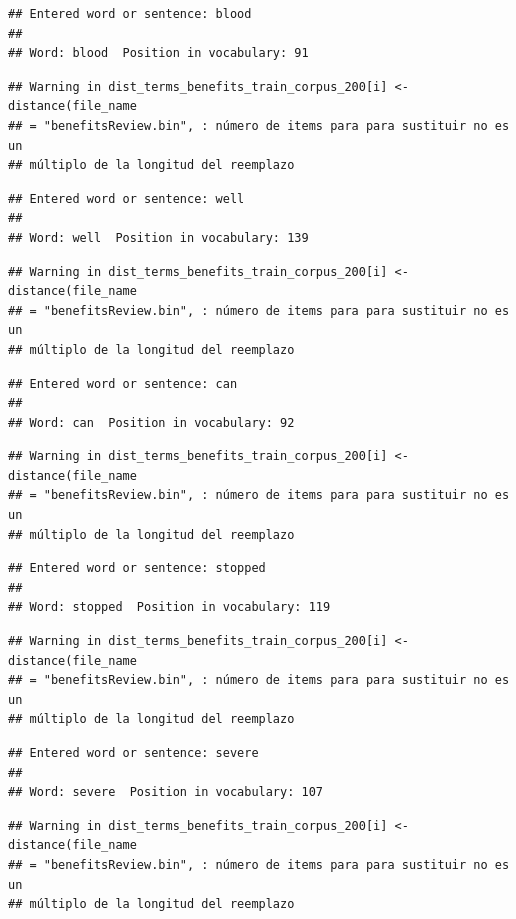 \documentclass[spanish,]{article}
\begin{document}
\begin{verbatim}
## Entered word or sentence: blood
## 
## Word: blood  Position in vocabulary: 91
\end{verbatim}

\begin{verbatim}
## Warning in dist_terms_benefits_train_corpus_200[i] <- distance(file_name
## = "benefitsReview.bin", : número de items para para sustituir no es un
## múltiplo de la longitud del reemplazo
\end{verbatim}

\begin{verbatim}
## Entered word or sentence: well
## 
## Word: well  Position in vocabulary: 139
\end{verbatim}

\begin{verbatim}
## Warning in dist_terms_benefits_train_corpus_200[i] <- distance(file_name
## = "benefitsReview.bin", : número de items para para sustituir no es un
## múltiplo de la longitud del reemplazo
\end{verbatim}

\begin{verbatim}
## Entered word or sentence: can
## 
## Word: can  Position in vocabulary: 92
\end{verbatim}

\begin{verbatim}
## Warning in dist_terms_benefits_train_corpus_200[i] <- distance(file_name
## = "benefitsReview.bin", : número de items para para sustituir no es un
## múltiplo de la longitud del reemplazo
\end{verbatim}

\begin{verbatim}
## Entered word or sentence: stopped
## 
## Word: stopped  Position in vocabulary: 119
\end{verbatim}

\begin{verbatim}
## Warning in dist_terms_benefits_train_corpus_200[i] <- distance(file_name
## = "benefitsReview.bin", : número de items para para sustituir no es un
## múltiplo de la longitud del reemplazo
\end{verbatim}

\begin{verbatim}
## Entered word or sentence: severe
## 
## Word: severe  Position in vocabulary: 107
\end{verbatim}

\begin{verbatim}
## Warning in dist_terms_benefits_train_corpus_200[i] <- distance(file_name
## = "benefitsReview.bin", : número de items para para sustituir no es un
## múltiplo de la longitud del reemplazo
\end{verbatim}
\end{document}
